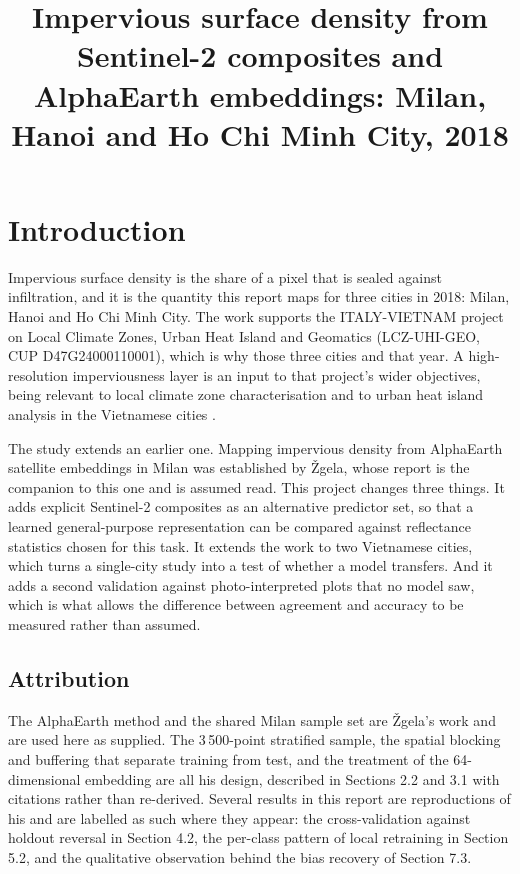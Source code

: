 \documentclass[11pt,a4paper]{article}
\title{Impervious surface density from Sentinel-2 composites and AlphaEarth
embeddings: Milan, Hanoi and Ho Chi Minh City, 2018}
\author{}
\date{}
\begin{document}
\maketitle

\section{Introduction}

Impervious surface density is the share of a pixel that is sealed against
infiltration, and it is the quantity this report maps for three cities in 2018:
Milan, Hanoi and Ho Chi Minh City. The work supports the ITALY-VIETNAM project on
Local Climate Zones, Urban Heat Island and Geomatics (LCZ-UHI-GEO, CUP
D47G24000110001), which is why those three cities and that year. A
high-resolution imperviousness layer is an input to that project's wider
objectives, being relevant to local climate zone characterisation and to urban
heat island analysis in the Vietnamese cities \cite[p.~11]{zgela2026}.

The study extends an earlier one. Mapping impervious density from AlphaEarth
satellite embeddings in Milan was established by Žgela, whose report is the
companion to this one and is assumed read. This project changes three things.
It adds explicit Sentinel-2 composites as an alternative predictor set, so that
a learned general-purpose representation can be compared against reflectance
statistics chosen for this task. It extends the work to two Vietnamese cities,
which turns a single-city study into a test of whether a model transfers. And it
adds a second validation against photo-interpreted plots that no model saw,
which is what allows the difference between agreement and accuracy to be
measured rather than assumed.

\subsection*{Attribution}

The AlphaEarth method and the shared Milan sample set are Žgela's work and are
used here as supplied. The 3\,500-point stratified sample, the spatial blocking
and buffering that separate training from test, and the treatment of the
64-dimensional embedding are all his design, described in Sections 2.2 and 3.1
with citations rather than re-derived. Several results in this report are
reproductions of his and are labelled as such where they appear: the
cross-validation against holdout reversal in Section 4.2, the per-class pattern
of local retraining in Section 5.2, and the qualitative observation behind the
bias recovery of Section 7.3.
\end{document}
